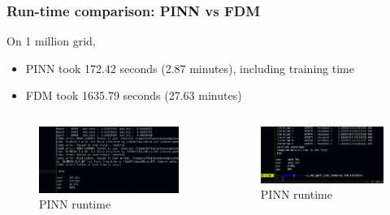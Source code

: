\begin{frame}
    \frametitle{Run-time comparison: PINN vs FDM}
    On 1 million grid,
    \begin{itemize}
        \item PINN took 172.42 seconds (2.87 minutes), including training time
        \item FDM took 1635.79 seconds (27.63 minutes)
    \end{itemize}
    \begin{columns}

        \begin{column}{0.5\textwidth}
            \begin{figure}
                \includegraphics[scale=0.3]{supportingFiles/runtime_PINN.png}
                \caption{PINN runtime}
            \end{figure}
        \end{column}

        \begin{column}{0.5\textwidth}
            \begin{figure}
                \includegraphics[scale=0.3]{supportingFiles/runtime_FDM.png}
                \caption{PINN runtime}
            \end{figure}
        \end{column}

    \end{columns}
\end{frame}

